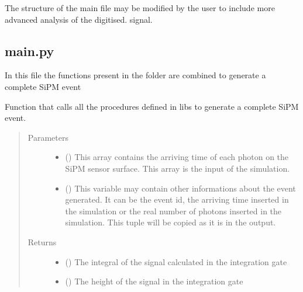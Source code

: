 \documentclass[letterpaper,10pt,english]{sphinxmanual}
\begin{document}
The structure of the main file may be modified by the user to include more advanced analysis of the digitised.  signal.


\subsection{main.py}
\label{\detokenize{structure:main-py}}
In this file the functions present in the  folder are combined to generate a complete SiPM event

\begin{fulllineitems}
\label{\detokenize{structure:main.SiPM}}
Function that calls all the procedures defined in libs to generate a complete SiPM event.
\begin{quote}\begin{description}
\item[{Parameters}] \leavevmode\begin{itemize}
\item {} 
 () \textendash{} This array contains the arriving time of each photon on the SiPM sensor surface. This array is the input of the simulation.

\item {} 
 () \textendash{} This variable may contain other informations about the event generated. It can be the event id, the arriving time inserted in the simulation or the real number of photons inserted in the simulation. This tuple will be copied as it is in the output.

\end{itemize}

\item[{Returns}] \leavevmode
\begin{itemize}
\item {} 
 () \textendash{} The integral of the signal calculated in the integration gate

\item {} 
 () \textendash{} The height of the signal in the integration gate


\end{itemize}
\end{description}
\end{quote}
\end{fulllineitems}
\end{document}
